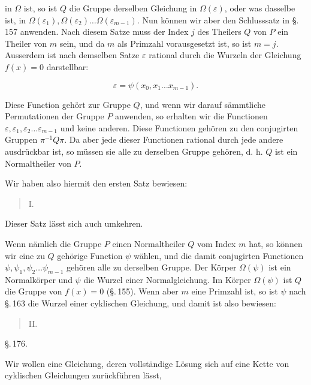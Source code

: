 in $\Omega$ ist, so ist $Q$ die Gruppe derselben Gleichung in $\Omega(\varepsilon)$, oder
was dasselbe ist, in $\Omega(\varepsilon_1), \Omega(\varepsilon_2) \ldots \Omega(\varepsilon_{m-1})$. Nun können wir
aber den Schlusssatz in \S.\,157 anwenden. Nach diesem Satze muss
der Index $j$ des Theilers $Q$ von $P$ ein Theiler von $m$ sein, und
da $m$ als Primzahl vorausgesetzt ist, so ist $m = j$. Ausserdem ist
nach demselben Satze $\varepsilon$ rational durch die Wurzeln der Gleichung
$f(x) = 0$ darstellbar:

\[
\varepsilon = \psi(x_0, x_1 \ldots x_{m-1}).
\]

Diese Function gehört zur Gruppe $Q$, und wenn wir darauf
sämmtliche Permutationen der Gruppe $P$ anwenden, so erhalten
wir die Functionen $\varepsilon, \varepsilon_1, \varepsilon_2 \ldots \varepsilon_{m-1}$ und keine anderen. Diese
Functionen gehören zu den conjugirten Gruppen $\pi^{-1}Q\pi$. Da
aber jede dieser Functionen rational durch jede andere ausdrückbar ist, so müssen sie alle zu derselben Gruppe gehören,
d. h. $Q$ ist ein Normaltheiler von $P$.

Wir haben also hiermit den ersten Satz bewiesen:

\begin{quote}
\noindent I.\ 
\end{quote}

Dieser Satz lässt sich auch umkehren.

Wenn nämlich die Gruppe $P$ einen Normaltheiler $Q$ vom
Index $m$ hat, so können wir eine zu $Q$ gehörige Function $\psi$
wählen, und die damit conjugirten Functionen $\psi, \psi_1, \psi_2 \ldots \psi_{m-1}$
gehören alle zu derselben Gruppe. Der Körper $\Omega(\psi)$ ist ein
Normalkörper und $\psi$ die Wurzel einer Normalgleichung. Im
Körper $\Omega(\psi)$ ist $Q$ die Gruppe von $f(x) = 0$ (\S.\,155). Wenn
aber $m$ eine Primzahl ist, so ist $\psi$ nach \S.\,163 die Wurzel einer
cyklischen Gleichung, und damit ist also bewiesen:

\begin{quote}
\noindent II.\ 
\end{quote}

\begin{center}
\S.\,176.

\end{center}

Wir wollen eine Gleichung, deren vollständige Lösung sich
auf eine Kette von cyklischen Gleichungen zurückführen lässt,
